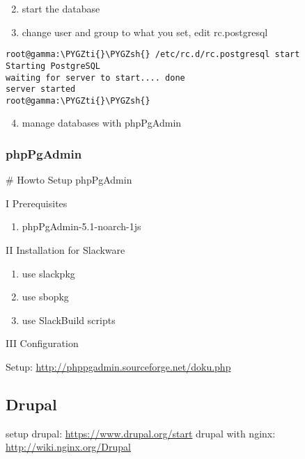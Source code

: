 \documentclass[letterpaper,10pt,english]{sphinxmanual}
\def\PYGZsh{\char`\#}
\def\PYGZti{\char`\~}
\begin{document}
\begin{enumerate}
\setcounter{enumi}{1}
\item {} 
start the database

\item {} 
change user and group to what you set, edit rc.postgresql

\end{enumerate}

\begin{Verbatim}[commandchars=\\\{\}]
root@gamma:\PYGZti{}\PYGZsh{} /etc/rc.d/rc.postgresql start
Starting PostgreSQL
waiting for server to start.... done
server started
root@gamma:\PYGZti{}\PYGZsh{}
\end{Verbatim}
\begin{enumerate}
\setcounter{enumi}{3}
\item {} 
manage databases with phpPgAdmin

\end{enumerate}


\subsubsection{phpPgAdmin}
\label{sdocs/databases/phpPgAdmin/phpPgAdmin::doc}\label{sdocs/databases/phpPgAdmin/phpPgAdmin:phppgadmin}
\# Howto Setup phpPgAdmin

I Prerequisites
\begin{enumerate}
\item {} 
phpPgAdmin-5.1-noarch-1js

\end{enumerate}

II Installation for Slackware
\begin{enumerate}
\item {} 
use slackpkg

\item {} 
use sbopkg

\item {} 
use SlackBuild scripts

\end{enumerate}

III Configuration

Setup: \href{http://phppgadmin.sourceforge.net/doku.php}{http://phppgadmin.sourceforge.net/doku.php}


\subsection{Drupal}
\label{sdocs/drupal/drupal:drupal}\label{sdocs/drupal/drupal::doc}
setup drupal: \href{https://www.drupal.org/start}{https://www.drupal.org/start}
drupal with nginx: \href{http://wiki.nginx.org/Drupal}{http://wiki.nginx.org/Drupal}
\end{document}
